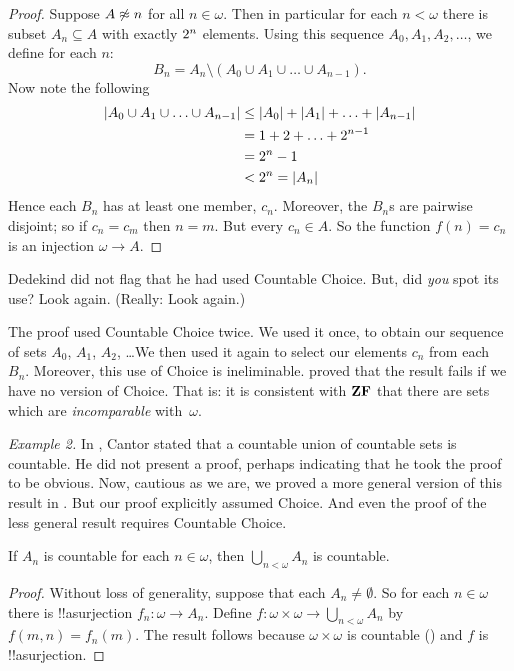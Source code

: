 \documentclass[../../../include/open-logic-section]{subfiles}
\begin{document}
\begin{proof}
Suppose $A \not\approx n$ for all $n \in \omega$. Then in particular
for each $n < \omega$ there is subset $A_n \subseteq A$ with exactly
$2^{n}$ elements. Using this sequence $A_0, A_1, A_2,
\ldots$, we define for each $n$:
\[
	B_n = A_n \setminus (A_0 \cup A_1 \cup \ldots \cup A_{n-1}).
\]
Now note the following
\begin{align*}
	\card{A_0 \cup A_1  \cup \ldots \cup A_{n-1}} 
	&\leq \card{A_0} + \card{A_1} + \ldots + \card{A_{n-1}}\\
	&=1 + 2 + \ldots + 2^{n-1}\\
	& = 2^n - 1\\
	& < 2^n = \card{A_n}
\end{align*}
Hence each $B_n$ has at least one member, $c_n$. Moreover, the $B_n$s
are pairwise disjoint; so if $c_n = c_m$ then $n = m$. But every $c_n
\in A$. So the function  $f(n) = c_n$ is an injection $\omega \to A$.
\end{proof}

Dedekind did not flag that he had used Countable Choice. But, did
\emph{you} spot its use? Look again. (Really: Look again.)

The proof used Countable Choice twice. We used it {once}, to obtain
our sequence of sets $A_0$, $A_1$, $A_2$, \dots\@ We then used it
again to select our elements $c_n$ from each~$B_n$. Moreover, this use
of Choice is ineliminable. \citet[p.~138]{Cohen1966} proved that the
result fails if we have no version of Choice. That is: it is
consistent with $\mathbf{ZF}$ that there are sets which are
\emph{incomparable} with~$\omega$.

\emph{Example 2.} In \citeyear{Cantor1878}, Cantor stated that {a
countable union of countable sets is countable}. He did not present a
proof, perhaps indicating that he took the proof to be obvious. Now,
cautious as we are, we proved a more general version of this result in
.  But our
proof explicitly assumed Choice. And even the proof of the less
general result requires Countable Choice.

\begin{thm}
If $A_n$ is countable for each $n \in \omega$, then $\bigcup_{n <
\omega} A_n$ is countable.
\end{thm}

\begin{proof}
Without loss of generality, suppose that each $A_n \neq \emptyset$. So
for each $n \in \omega$ there is !!a{surjection} $f_n \colon \omega
\to A_n$. Define $f \colon \omega \times \omega \to \bigcup_{n <
\omega} A_n$ by $f(m, n) = f_n(m)$. The result follows because $\omega
\times \omega$ is countable
() and $f$ is
!!a{surjection}.
\end{proof}
\end{document}
